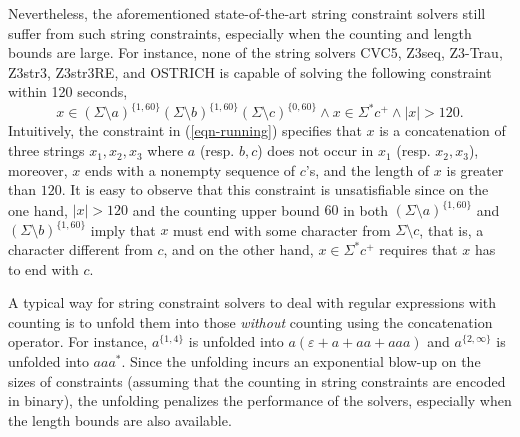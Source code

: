 Nevertheless, the aforementioned state-of-the-art string constraint solvers still suffer from such string constraints, especially when the counting and length bounds are large. For instance, none of the string solvers CVC5, Z3seq, Z3-Trau, Z3str3, Z3str3RE, and OSTRICH is capable of solving the following constraint within 120 seconds,
%
\begin{equation}\label{eqn-running}
x \in (\Sigma \setminus a)^{\{1, 60\}} (\Sigma \setminus b)^{\{1, 60\}} (\Sigma \setminus c)^{\{0, 60\}} \wedge x \in \Sigma^* c^+ \wedge |x| > 120.
\end{equation}
Intuitively, the constraint in (\ref{eqn-running}) specifies that $x$ is a concatenation of three strings $x_1, x_2, x_3$ where $a$ (resp. $b, c$) does not occur in $x_1$ (resp. $x_2, x_3$), moreover, $x$ ends with a nonempty sequence of $c$'s, and the length of $x$ is greater than $120$. It is easy to observe that this constraint is unsatisfiable since on the one hand, $|x| > 120$ and the counting upper bound $60$ in both $(\Sigma \setminus a)^{\{1, 60\}}$ and $(\Sigma \setminus b)^{\{1, 60\}}$ imply that $x$ must end with some character from $\Sigma \setminus c$, that is, a character different from $c$, and on the other hand, $x \in \Sigma^*c^+$ requires that $x$ has to end with $c$.

A typical way for string constraint solvers to deal with regular expressions with counting is to unfold them into those \emph{without} counting using the concatenation operator. For instance, $a^{\{1, 4\}}$ is unfolded into $a(\varepsilon + a + aa + aaa)$ and $a^{\{2,\infty\}}$ is unfolded into $aaa^{*}$. Since the unfolding incurs an exponential blow-up on the sizes of constraints (assuming that the counting in string constraints are encoded in binary), the unfolding penalizes the performance of the solvers, especially when the length bounds are also available.

